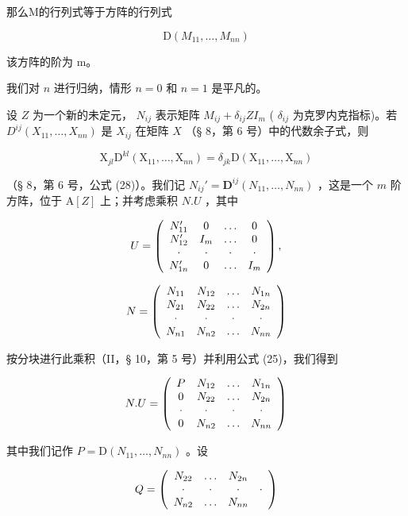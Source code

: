 那么M的行列式等于方阵的行列式

\[
\mathrm{D} (M _ {1 1}, \dots , M _ {n n})
\]

该方阵的阶为 m。

我们对 \(n\) 进行归纳，情形 \(n = 0\) 和 \(n = 1\) 是平凡的。

设 \(Z\) 为一个新的未定元， \(N_{ij}\) 表示矩阵 \(M_{ij} + \delta_{ij}ZI_m\) ( \(\delta_{ij}\) 为克罗内克指标)。若 \(D^{ij}(X_{11},\ldots,X_{nn})\) 是 \(X_{ij}\) 在矩阵 \(X\) （§ 8，第 6 号）中的代数余子式，则

\[
\mathrm{X} _ {j l} \mathrm{D} ^ {k l} (\mathrm{X} _ {1 1}, \dots , \mathrm{X} _ {n n}) = \delta_ {j k} \mathrm{D} (\mathrm{X} _ {1 1}, \dots , \mathrm{X} _ {n n})\tag{25}
\]

（§ 8，第 6 号，公式 (28)）。我们记 \(N_{ij}' = \mathbf{D}^{ij}(N_{11}, \ldots, N_{nn})\) ，这是一个 \(m\) 阶方阵，位于 \(\mathrm{A}[Z]\) 上；并考虑乘积 \(N.U\) ，其中

\[
U = \left( \begin{array}{c c c c} N _ {1 1} ^ {\prime} & 0 & \ldots & 0 \\ N _ {1 2} ^ {\prime} & I _ {m} & \ldots & 0 \\ \cdot & \cdot & \cdot & \cdot \\ N _ {1 n} ^ {\prime} & 0 & \ldots & I _ {m} \end{array} \right),
\]

\[
N = \left( \begin{array}{c c c c} N _ {1 1} & N _ {1 2} & \ldots & N _ {1 n} \\ N _ {2 1} & N _ {2 2} & \ldots & N _ {2 n} \\ \cdot & \cdot & \cdot & \cdot \\ N _ {n 1} & N _ {n 2} & \ldots & N _ {n n} \end{array} \right)
\]

按分块进行此乘积（II，§ 10，第 5 号）并利用公式 (25)，我们得到

\[
N. U = \left( \begin{array}{c c c c} P & N _ {1 2} & \ldots & N _ {1 n} \\ 0 & N _ {2 2} & \ldots & N _ {2 n} \\ \cdot & \cdot & \cdot & \cdot \\ 0 & N _ {n 2} & \ldots & N _ {n n} \end{array} \right)
\]

其中我们记作 \(P = \mathrm{D}(N_{11},\ldots ,N_{nn})\) 。设

\[
Q = \left( \begin{array}{c c c c} N _ {2 2} & \ldots & N _ {2 n} \\ \cdot & \cdot & \cdot & \cdot \\ N _ {n 2} & \ldots & N _ {n n} \end{array} \right)
\]

